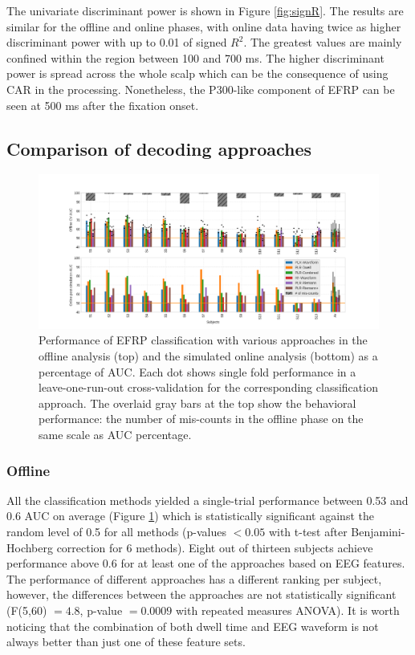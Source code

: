 \documentclass[12pt]{iopart}
\begin{document}
The univariate discriminant power is shown in Figure \ref{fig:signR}.
The results are similar for the offline and online phases, with online data having twice
as higher discriminant power with up to 0.01 of signed $R^2$.
The greatest values are mainly confined within the region between 100 and 700 ms.
The higher discriminant power is spread across the whole scalp which can be the consequence
of using CAR in the processing. Nonetheless, the P300-like component of EFRP can be seen at 500 ms
after the fixation onset.



\subsection{Comparison of decoding approaches}
\label{sec:class}

\begin{figure}[!t]
    \includegraphics[trim={3cm 0cm 2cm 0cm},clip,width=1.1\columnwidth]{../images/ClassificationAll_FixDurSep.png}
    \caption{Performance of EFRP classification with various approaches in the offline analysis (top)
    and the simulated online analysis (bottom) as a percentage of AUC.
    Each dot shows single fold performance
    in a leave-one-run-out cross-validation for the corresponding classification approach.
    The overlaid gray bars at the top show the behavioral performance:
    the number of mis-counts in the offline phase on the same scale as AUC percentage.}
\label{fig:classAll}
\end{figure}

\subsubsection*{Offline}
All the classification methods yielded a single-trial 
performance between 0.53 and 0.6 AUC on average
(Figure \ref{fig:classAll})
which is statistically significant against the random level of 0.5 
for all methods
(p-values $< 0.05$ with t-test after Benjamini-Hochberg correction
for 6 methods).
Eight out of thirteen subjects achieve performance 
above 0.6 for at least one of the approaches based
on EEG features.
The performance of different approaches has a different ranking per subject, however,
the differences between
the approaches are not statistically significant (F(5,60) $=4.8$, p-value $= 0.0009$ with repeated measures ANOVA).
It is worth noticing that the combination of both dwell time and EEG waveform is not always
better than just one of these feature sets.
\end{document}
